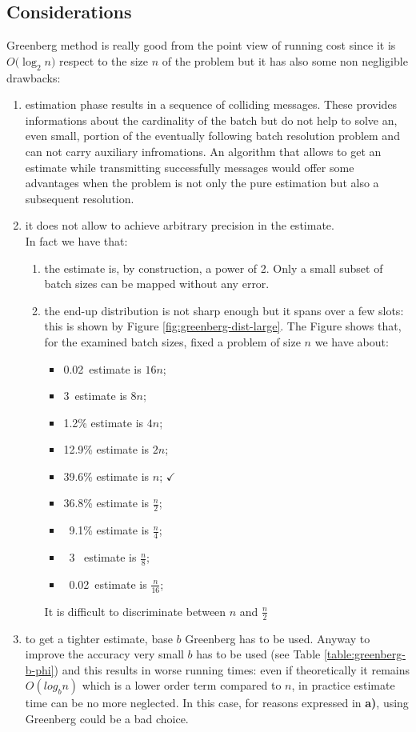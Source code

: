 \documentclass[12pt,a4paper]{report}
\begin{document}
\subsection{Considerations}
Greenberg method is really good from the point view of running cost since it is $O\bigl(\log_{2}n\bigr)$ respect to the size  $n$ of the problem but it has also some non negligible drawbacks:
\begin{enumerate}[\bf a)]
\item estimation phase results in a sequence of colliding messages. These provides informations about the cardinality of the batch but do not help to solve an, even small, portion of the eventually following batch resolution problem and can not carry auxiliary infromations. An algorithm that allows to get an estimate while transmitting successfully messages would offer some advantages when the problem is not only the pure estimation but also a subsequent resolution.
\item it does not allow to achieve arbitrary precision in the estimate.\\ In fact we have that:
	\begin{enumerate}[\it i.]
		\item  the estimate is, by construction, a power of 2. Only a small subset of batch sizes can be mapped without any error.
		\item the end-up distribution is not sharp enough but it spans over a few slots: this is shown by Figure \ref{fig:greenberg-dist-large}. The Figure shows that, for the examined batch sizes, fixed a problem of size $n$ we have about:
		\begin{itemize}
		\item 0.02\textpertenthousand\  estimate is $16n$;
		\item 3\textpertenthousand\  estimate is $8n$;
		\item 1.2\% estimate is $4n$;
		\item 12.9\% estimate is $2n$;
		\item 39.6\% estimate is $n$; $\checkmark$
		\item 36.8\% estimate is $\frac{n}{2}$;
		\item \ 9.1\% estimate is $\frac{n}{4}$;
		\item \  3 \textperthousand\ estimate is $\frac{n}{8}$;
		\item \ 0.02\textpertenthousand\ estimate is $\frac{n}{16}$;
		\end{itemize}
		It is difficult to discriminate between $n$ and $\frac{n}{2}$ 
	\end{enumerate}
\item to get a tighter estimate, base $b$ Greenberg has to be used. Anyway to improve the accuracy very small $b$ has to be used (see Table \ref{table:greenberg-b-phi}) and this results in worse running times: even if theoretically it remains $O(log_{b}n)$ which is a lower order term compared to $n$, in practice estimate time can be no more neglected. In this case, for reasons expressed in {\bf a)}, using Greenberg  could be a bad choice.
\end{enumerate}
\end{document}
